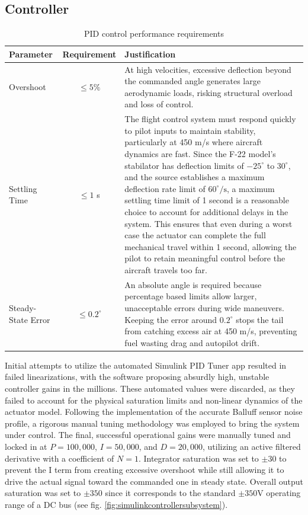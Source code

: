 \documentclass[
bindingoffset=5mm,  %
footnoteindent=3mm, %
hyphenation=true    %
]{src/wut-thesis}
\begin{document}
	\subsection{Controller}
	
	\begin{table}[htbp]
		\centering
		\begin{tabular}{lcp{7cm}}
			\hline
			\textbf{Parameter} & \textbf{Requirement} & \textbf{Justification} \\
			\hline
			Overshoot & $\leq 5\%$ & At high velocities, excessive deflection beyond the commanded angle generates large aerodynamic loads, risking structural overload and loss of control. \\
			\addlinespace
			Settling Time & $\leq 1$ s & The flight control system must respond quickly to pilot inputs to maintain stability, particularly at 450 m/s where aircraft dynamics are fast. Since the F-22 model's stabilator has deflection limits of $-25^\circ$ to $30^\circ$, and the source \cite{Nguyen1979Simulator} establishes a maximum deflection rate limit of $60^\circ/\text{s}$, a maximum settling time limit of 1 second is a reasonable choice to account for additional delays in the system. This ensures that even during a worst case the actuator can complete the full mechanical travel within 1 second, allowing the pilot to retain meaningful control before the aircraft travels too far. \\
			\addlinespace
			Steady-State Error & $\leq 0.2^\circ$ & An absolute angle is required because percentage based limits allow larger, unacceptable errors during wide maneuvers. Keeping the error around $0.2^\circ$ stops the tail from catching excess air at 450 m/s, preventing fuel wasting drag and autopilot drift. \\
			\hline
		\end{tabular}
		\caption{PID control performance requirements}
		\label{tab:pid_requirements}
	\end{table}
	
	Initial attempts to utilize the automated Simulink PID Tuner app resulted in failed linearizations, with the software proposing absurdly high, unstable controller gains in the millions. These automated values were discarded, as they failed to account for the physical saturation limits and non-linear dynamics of the actuator model. Following the implementation of the accurate Balluff sensor noise profile, a rigorous manual tuning methodology was employed to bring the system under control. The final, successful operational gains were manually tuned and locked in at $P = 100{,}000$, $I = 50{,}000$, and $D = 20{,}000$, utilizing an active filtered derivative with a coefficient of $N = 1$. Integrator saturation was set to $\pm30$ to prevent the I term from creating excessive overshoot while still allowing it to drive the actual signal toward the commanded one in steady state. Overall output saturation was set to $\pm350$ since it corresponds to the standard $\pm350 \text{V}$ operating range of a DC bus
	(see fig. \ref{fig:simulinkcontrollersubsystem}).
	
\end{document}
